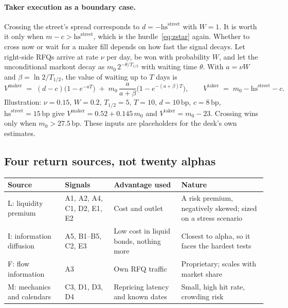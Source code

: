 \documentclass[11pt,letterpaper]{article}
\newcommand{\bp}{\,\mathrm{bp}}
\newcommand{\hs}{\mathrm{hs}}             %
\begin{document}
\paragraph{Taker execution as a boundary case.}
Crossing the street's spread corresponds to $d=-\hs^{\mathrm{street}}$ with $W=1$. It is worth it only when $m-c>\hs^{\mathrm{street}}$, which is the hurdle~\eqref{eq:zstar} again. Whether to cross now or wait for a maker fill depends on how fast the signal decays. Let right-side RFQs arrive at rate $\nu$ per day, be won with probability $W$, and let the unconditional markout decay as $m_0\,2^{-\theta/T_{1/2}}$ with waiting time $\theta$. With $a=\nu W$ and $\beta=\ln 2/T_{1/2}$, the value of waiting up to $T$ days is
\begin{equation}
V^{\mathrm{maker}} \;=\; (d-c)\bigl(1-e^{-aT}\bigr) \;+\; m_0\,\frac{a}{a+\beta}\bigl(1-e^{-(a+\beta)T}\bigr),
\qquad
V^{\mathrm{taker}} \;=\; m_0-\hs^{\mathrm{street}}-c .
\label{eq:wait}
\end{equation}
Illustration: $\nu=0.15$, $W=0.2$, $T_{1/2}=5$, $T=10$, $d=10\bp$, $c=8\bp$, $\hs^{\mathrm{street}}=15\bp$ give $V^{\mathrm{maker}}=0.52+0.145\,m_0$ and $V^{\mathrm{taker}}=m_0-23$. Crossing wins only when $m_0>27.5\bp$. These inputs are placeholders for the desk's own estimates.

\subsection{Four return sources, not twenty alphas}
\begin{center}
\begin{tabularx}{\textwidth}{@{}l l X X@{}}
\toprule
Source & Signals & Advantage used & Nature \\
\midrule
L: liquidity premium & A1, A2, A4, C1, D2, E1, E2 & Cost and outlet & A risk premium, negatively skewed; sized on a stress scenario \\
I: information diffusion & A5, B1--B5, C2, E3 & Low cost in liquid bonds, nothing more & Closest to alpha, so it faces the hardest tests \\
F: flow information & A3 & Own RFQ traffic & Proprietary; scales with market share \\
M: mechanics and calendars & C3, D1, D3, D4 & Repricing latency and known dates & Small, high hit rate, crowding risk \\
\bottomrule
\end{tabularx}
\end{center}
\end{document}
